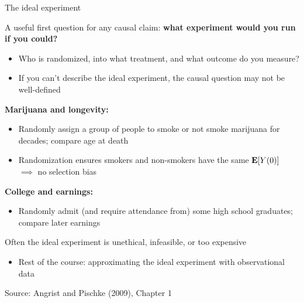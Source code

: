 \documentclass[compress, 8pt]{beamer}
\begin{document}
\begin{frame}{The ideal experiment}

A useful first question for any causal claim: \textbf{what experiment would you run if you could?}
\begin{itemize}
    \item Who is randomized, into what treatment, and what outcome do you measure?
    \item If you can't describe the ideal experiment, the causal question may not be well-defined
\end{itemize}

\pause
\vspace{2ex}
\textbf{Marijuana and longevity:}
\begin{itemize}
    \item Randomly assign a group of people to smoke or not smoke marijuana for decades; compare age at death
    \item Randomization ensures smokers and non-smokers have the same $\mathbf{E} [Y(0)]$ $\implies$ no selection bias
\end{itemize}

\pause
\vspace{2ex}
\textbf{College and earnings:}
\begin{itemize}
    \item Randomly admit (and require attendance from) some high school graduates; compare later earnings
\end{itemize}

\pause
\vspace{2ex}
Often the ideal experiment is unethical, infeasible, or too expensive
\begin{itemize}
    \item Rest of the course: approximating the ideal experiment with observational data
\end{itemize}

\vspace{2ex}
{\footnotesize Source: Angrist and Pischke (2009), Chapter 1}
\end{frame}
\end{document}
